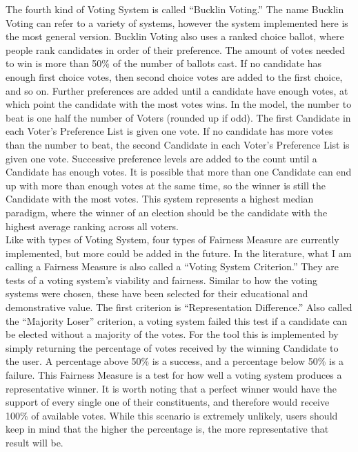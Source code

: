 \documentclass[12pt]{article}
\begin{document}
\qquad The fourth kind of Voting System is called ``Bucklin Voting.'' The name Bucklin Voting can refer to a variety of systems, however the system implemented here is the most general version. Bucklin Voting also uses a ranked choice ballot, where people rank candidates in order of their preference. The amount of votes needed to win is more than 50\% of the number of ballots cast. If no candidate has enough first choice votes, then second choice votes are added to the first choice, and so on. Further preferences are added until a candidate have enough votes, at which point the candidate with the most votes wins. In the model, the number to beat is one half the number of Voters (rounded up if odd). The first Candidate in each Voter's Preference List is given one vote. If no candidate has more votes than the number to beat, the second Candidate in each Voter's Preference List is given one vote. Successive preference levels are added to the count until a Candidate has enough votes. It is possible that more than one Candidate can end up with more than enough votes at the same time, so the winner is still the Candidate with the most votes. This system represents a highest median paradigm, where the winner of an election should be the candidate with the highest average ranking across all voters. \\

\qquad Like with types of Voting System, four types of Fairness Measure are currently implemented, but more could be added in the future. In the literature, what I am calling a Fairness Measure is also called a ``Voting System Criterion.'' They are tests of a voting system's viability and fairness. Similar to how the voting systems were chosen, these have been selected for their educational and demonstrative value. The first criterion is ``Representation Difference.'' Also called the ``Majority Loser'' criterion, a voting system failed this test if a candidate can be elected without a majority of the votes. For the tool this is implemented by simply returning the percentage of votes received by the winning Candidate to the user. A percentage above 50\% is a success, and a percentage below 50\% is a failure. This Fairness Measure is a test for how well a voting system produces a representative winner. It is worth noting that a perfect winner would have the support of every single one of their constituents, and therefore would receive 100\% of available votes. While this scenario is extremely unlikely, users should keep in mind that the higher the percentage is, the more representative that result will be. \\
\end{document}
